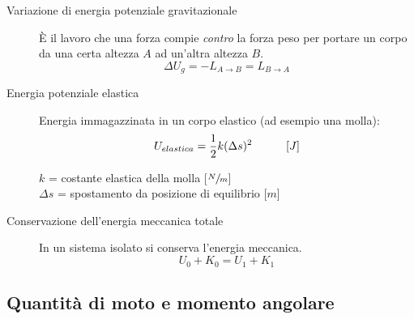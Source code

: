 \documentclass[a4paper,11pt,italian]{article}
\begin{document}
\begin{description}
  \item[Variazione di energia potenziale gravitazionale] 
  È il lavoro che una forza compie \emph{contro} la forza peso per portare un corpo da una certa altezza $ A $ ad un'altra altezza $ B $.
  \[ \Delta U_g = -L_{A\rightarrow B} = L_{B\rightarrow A} \]
  
  \item[Energia potenziale elastica] 
  Energia immagazzinata in un corpo elastico (ad esempio una molla):
  \[ U_{elastica} = \frac{1}{2} k (\Delta s)^2 \hspace*{3em} [J] \]
  \begin{multicols}{2}
  $ k $ = costante elastica della molla [$ \sfrac{N}{m} $]\\
  $ \Delta s $ = spostamento da posizione di equilibrio [$ m $]
  \end{multicols}
  
  \item[Conservazione dell'energia meccanica totale] 
  In un sistema isolato si conserva l'energia meccanica. 
  \[ U_0 + K_0 = U_1 + K_1 \]
\end{description}



\subsection{Quantità di moto e momento angolare}
\end{document}
